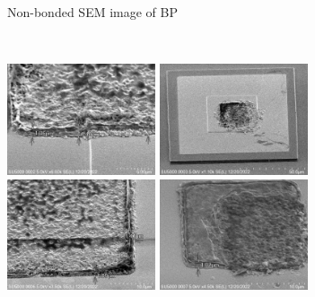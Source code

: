 \begin{figure}
\begin{subfigure}[t]{0.45\textwidth}
        \caption{Non-bonded SEM image of BP}
        \label{fig:P3_non_bonded_BP}
    \end{subfigure}
    ~
    \begin{subfigure}[c]{0.45\textwidth}
        \centering
            \includegraphics[width=0.48\textwidth]{Main/Ch4/Phase-4/P4-T02/LED/IMG_No0002.png}
            \includegraphics[width=0.48\textwidth]{Main/Ch4/Phase-4/P4-T02/LED/IMG_No0003.png} \\
            \includegraphics[width=0.48\textwidth]{Main/Ch4/Phase-4/P4-T02/LED/IMG_No0006.png}
            \includegraphics[width=0.48\textwidth]{Main/Ch4/Phase-4/P4-T02/LED/IMG_No0007.png}

\end{subfigure}
\end{figure}

